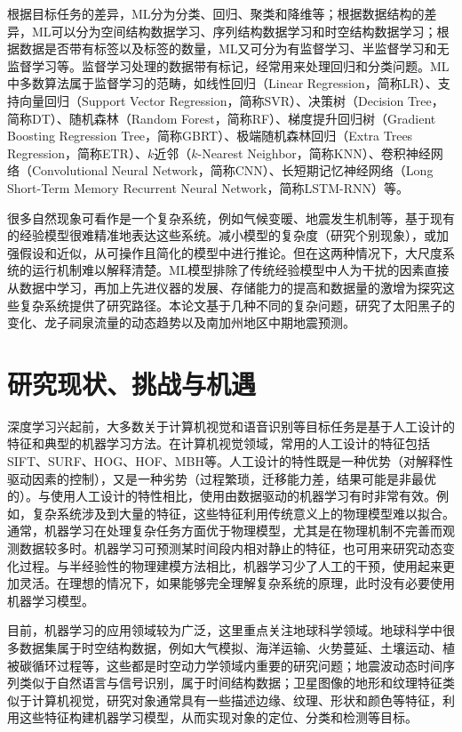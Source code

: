 根据目标任务的差异，ML分为分类、回归、聚类和降维等；根据数据结构的差异，ML可以分为空间结构数据学习、序列结构数据学习和时空结构数据学习；根据数据是否带有标签以及标签的数量，ML又可分为有监督学习、半监督学习和无监督学习等。监督学习处理的数据带有标记，经常用来处理回归和分类问题。ML中多数算法属于监督学习的范畴，如线性回归（Linear Regression，简称LR）、支持向量回归（Support Vector Regression，简称SVR）、决策树（Decision Tree，简称DT）、随机森林（Random Forest，简称RF）、梯度提升回归树（Gradient Boosting Regression Tree，简称GBRT）、极端随机森林回归（Extra Trees Regression，简称ETR）、$k$近邻（$k$-Nearest Neighbor，简称KNN）、卷积神经网络（Convolutional Neural Network，简称CNN）、长短期记忆神经网络（Long Short-Term Memory Recurrent Neural Network，简称LSTM-RNN）等。

很多自然现象可看作是一个复杂系统，例如气候变暖、地震发生机制等\citep{fan2021statistical}，基于现有的经验模型很难精准地表达这些系统。减小模型的复杂度（研究个别现象），或加强假设和近似，从可操作且简化的模型中进行推论。但在这两种情况下，大尺度系统的运行机制难以解释清楚。ML模型排除了传统经验模型中人为干扰的因素直接从数据中学习，再加上先进仪器的发展、存储能力的提高和数据量的激增为探究这些复杂系统提供了研究路径。本论文基于几种不同的复杂问题，研究了太阳黑子的变化、龙子祠泉流量的动态趋势以及南加州地区中期地震预测。

\section{研究现状、挑战与机遇}\label{sec:intro_veiw}

深度学习兴起前，大多数关于计算机视觉和语音识别等目标任务是基于人工设计的特征和典型的机器学习方法。在计算机视觉领域，常用的人工设计的特征包括SIFT、SURF、HOG、HOF、MBH等。人工设计的特性既是一种优势（对解释性驱动因素的控制），又是一种劣势（过程繁琐，迁移能力差，结果可能是非最优的）。与使用人工设计的特性相比，使用由数据驱动的机器学习有时非常有效。例如，复杂系统涉及到大量的特征，这些特征利用传统意义上的物理模型难以拟合。通常，机器学习在处理复杂任务方面优于物理模型，尤其是在物理机制不完善而观测数据较多时。机器学习可预测某时间段内相对静止的特征，也可用来研究动态变化过程。与半经验性的物理建模方法相比，机器学习少了人工的干预，使用起来更加灵活。在理想的情况下，如果能够完全理解复杂系统的原理，此时没有必要使用机器学习模型。

目前，机器学习的应用领域较为广泛，这里重点关注地球科学领域。地球科学中很多数据集属于时空结构数据，例如大气模拟、海洋运输、火势蔓延、土壤运动、植被碳循环过程等，这些都是时空动力学领域内重要的研究问题\citep{mathieu2015deep,oh2015action}；地震波动态时间序列类似于自然语言与信号识别，属于时间结构数据\citep{perol2018convolutional,devries2018deep,rouet2017machine}；卫星图像的地形和纹理特征类似于计算机视觉，研究对象通常具有一些描述边缘、纹理、形状和颜色等特征，利用这些特征构建机器学习模型，从而实现对象的定位、分类和检测等目标\citep{lee1990neural}。


